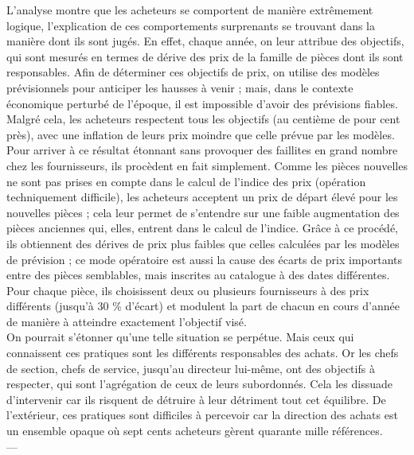 \documentclass{kaobook}
\begin{document}
L’analyse montre que les acheteurs se comportent de manière extrêmement logique, l’explication de ces comportements surprenants se trouvant dans la manière dont ils sont jugés. En effet, chaque année, on leur attribue des objectifs, qui sont mesurés en termes de dérive des prix de la famille de pièces dont ils sont responsables. Afin de déterminer ces objectifs de prix, on utilise des modèles prévisionnels pour anticiper les hausses à venir ; mais, dans le contexte économique perturbé de l’époque, il est impossible d’avoir des prévisions fiables. Malgré cela, les acheteurs respectent tous les objectifs (au centième de pour cent près), avec une inflation de leurs prix moindre que celle prévue par les modèles. Pour arriver à ce résultat étonnant sans provoquer des faillites en grand nombre chez les fournisseurs, ils procèdent en fait simplement. Comme les pièces nouvelles ne sont pas prises en compte dans le calcul de l’indice des prix (opération techniquement difficile), les acheteurs acceptent un prix de départ élevé pour les nouvelles pièces ; cela leur permet de s’entendre sur une faible augmentation des pièces anciennes qui, elles, entrent dans le calcul de l’indice. Grâce à ce procédé, ils obtiennent des dérives de prix plus faibles que celles calculées par les modèles de prévision ; ce mode opératoire est aussi la cause des écarts de prix importants entre des pièces semblables, mais inscrites au catalogue à des dates différentes. Pour chaque pièce, ils choisissent deux ou plusieurs fournisseurs à des prix différents (jusqu’à 30 \% d’écart) et modulent la part de chacun en cours d’année de manière à atteindre exactement l’objectif visé.\\

On pourrait s’étonner qu’une telle situation se perpétue. Mais ceux qui connaissent ces pratiques sont les différents responsables des achats. Or les chefs de section, chefs de service, jusqu’au directeur lui-même, ont des objectifs à respecter, qui sont l’agrégation de ceux de leurs subordonnés. Cela les dissuade d’intervenir car ils risquent de détruire à leur détriment tout cet équilibre. De l’extérieur, ces pratiques sont difficiles à percevoir car la direction des achats est un ensemble opaque où sept cents acheteurs gèrent quarante mille références.\\
---\\
\end{document}
